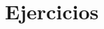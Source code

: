 \documentclass[aspectratio=169,11pt]{beamer}
\begin{document}
%
%
%
%
%
%
%
%
%
%
%


\section{Ejercicios}
\end{document}
